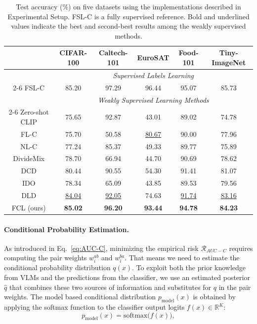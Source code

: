 \documentclass[10pt,twocolumn,letterpaper]{article}
\begin{document}
\begin{table}[t]
\caption{Test accuracy (\%) on five datasets using the implementations described in Experimental Setup. FSL-C is a fully supervised reference. Bold and underlined values indicate the best and second-best results among the weakly supervised methods.}
\label{tab:method-compare-clip}



\centering
\setlength{\tabcolsep}{5pt}
\small
\begin{tabular*}{\textwidth}{@{\extracolsep{\fill}}cccccc}
\toprule
  & \textbf{CIFAR-100} & \textbf{Caltech-101} & \textbf{EuroSAT} & \textbf{Food-101} & \textbf{Tiny-ImageNet} \\
\midrule
& \multicolumn{5}{c}{\textit{Supervised Labels Learning}} \\
\cmidrule(lr){2-6}
FSL-C  & 85.20 & 97.29 & 96.44 & 95.07 & 85.73 \\
\midrule
& \multicolumn{5}{c}{\textit{Weakly Supervised Learning Methods}} \\
\cmidrule(lr){2-6}
Zero-shot CLIP \cite{radford2021clip} & 75.65 & 92.87 & 43.01 & 89.02 & 74.78 \\
FL-C \cite{radford2021clip} & 75.70 & 50.58 & \underline{80.67} & 90.00 & 77.96 \\
NL-C \cite{radford2021clip} & 77.24 & 85.37 & 49.33 & 89.77 & 75.89 \\
DivideMix \cite{li2020dividemix} & 78.70 & 66.94 & 44.70 & 90.69 & 78.62 \\
DCD \cite{mu2025dcd} & 80.44 & 90.55 & 54.30 & 91.41 & 81.07 \\
IDO \cite{zhang2025ido} & 78.34 & 65.09 & 43.85 & 89.53 & 79.56 \\
DLD \cite{hou2025dld} & \underline{84.04} & \underline{92.05} & 74.63 & \underline{91.74} & \underline{83.16} \\
FCL (ours)        & \textbf{85.02} & \textbf{96.20} & \textbf{93.44} & \textbf{94.78} & \textbf{84.23} \\
\bottomrule
\end{tabular*}

\end{table}

\paragraph{Conditional Probability Estimation.}
As introduced in Eq.~\eqref{eq:AUC-C}, minimizing the empirical risk $\mathcal{R}_{AUC-C}$ requires computing the pair weights $w_{i}^{ab}$ and $w_{i}^{ba}$. That means we need to estimate the conditional probability distribution $q(x)$. To exploit both the prior knowledge from VLMs and the predictions from the classifier, we use an estimated posterior $\widehat q$ that combines these two sources of information and substitutes for $q$ in the pair weights. The model based conditional distribution $p_{\mathrm{model}}(x)$ is obtained by applying the softmax function to the classifier output logits $f(x)\in\mathbb{R}^{K}$:
\begin{equation}
    p_{\mathrm{model}}(x)=\mathrm{softmax}\big(f(x)\big),
\end{equation}
\end{document}
